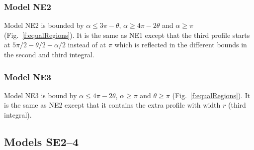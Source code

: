 





\subsubsection{Model NE2} \label{NE2}

Model NE2 is bounded by $\alpha \le 3\pi - \theta$, $\alpha \ge 4\pi - 2\theta$ and $\alpha \ge \pi$ (Fig.~\ref{f:equalRegions}). It is the same as NE1 except that the third profile starts at $5\pi/2 - \theta/2 - \alpha/2$ instead of at $\pi$ which is reflected in the different bounds in the second and third integral.



\subsubsection{Model NE3} \label{NE3}

Model NE3 is bound by $\alpha \le 4\pi - 2\theta$, $\alpha \ge \pi$ and $\theta \ge \pi$ (Fig.~\ref{f:equalRegions}). It is the same as NE2 except that it contains the extra profile with width $r$ (third integral).






\subsection{Models SE2--4} \label{SE}

